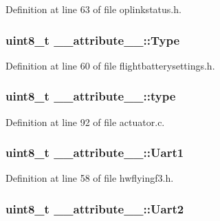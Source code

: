 \-Definition at line 63 of file oplinkstatus.\-h.

\hypertarget{struct____attribute_____a23ebcee49703597918476ca49c44e321}{
\subsubsection[{\-Type}]{\setlength{\rightskip}{0pt plus 5cm}uint8\-\_\-t {\bf \-\_\-\-\_\-attribute\-\_\-\-\_\-\-::\-Type}}}\label{struct____attribute_____a23ebcee49703597918476ca49c44e321}


\-Definition at line 60 of file flightbatterysettings.\-h.

\hypertarget{struct____attribute_____a30e60959661cf2e3b2dcc52e5d3e9249}{
\subsubsection[{type}]{\setlength{\rightskip}{0pt plus 5cm}uint8\-\_\-t {\bf \-\_\-\-\_\-attribute\-\_\-\-\_\-\-::type}}}\label{struct____attribute_____a30e60959661cf2e3b2dcc52e5d3e9249}


\-Definition at line 92 of file actuator.\-c.

\hypertarget{struct____attribute_____ad34e6887c00e18725ad8c765dd0e1025}{
\subsubsection[{\-Uart1}]{\setlength{\rightskip}{0pt plus 5cm}uint8\-\_\-t {\bf \-\_\-\-\_\-attribute\-\_\-\-\_\-\-::\-Uart1}}}\label{struct____attribute_____ad34e6887c00e18725ad8c765dd0e1025}


\-Definition at line 58 of file hwflyingf3.\-h.

\hypertarget{struct____attribute_____a82a02661a1f10da3c596d977f9af5bfb}{
\subsubsection[{\-Uart2}]{\setlength{\rightskip}{0pt plus 5cm}uint8\-\_\-t {\bf \-\_\-\-\_\-attribute\-\_\-\-\_\-\-::\-Uart2}}}\label{struct____attribute_____a82a02661a1f10da3c596d977f9af5bfb}


